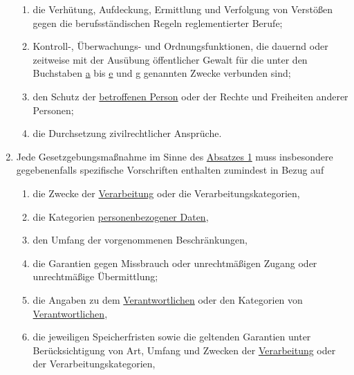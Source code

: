 \begin{enumerate}
\begin{enumerate}
    \item die Verhütung, Aufdeckung, Ermittlung und Verfolgung von Verstößen gegen die berufsständischen Regeln
     reglementierter Berufe;%
    \label{itm:23-1g}

    \item Kontroll-, Überwachungs- und Ordnungsfunktionen, die dauernd oder zeitweise mit der Ausübung öffentlicher
     Gewalt für die unter den Buchstaben \hyperref[itm:23-1a]{a} bis \hyperref[itm:23-1e]{e} und \hyperref[itm:23-1g]
     {g} genannten Zwecke verbunden sind;%
    \label{itm:23-1h}

    \item den Schutz der \hyperref[itm:04-1]{betroffenen Person} oder der Rechte und Freiheiten anderer Personen;%
    \label{itm:23-1i}

    \item die Durchsetzung zivilrechtlicher Ansprüche.%
    \label{itm:23-1j}

  \end{enumerate}

  \item Jede Gesetzgebungsmaßnahme im Sinne des \hyperref[itm:23-1]{Absatzes 1} muss insbesondere gegebenenfalls
   spezifische Vorschriften enthalten zumindest in Bezug auf%
  \label{itm:23-2}

  \begin{enumerate}
  
    \item die Zwecke der \hyperref[itm:04-2]{Verarbeitung} oder die Verarbeitungskategorien,%
    \label{itm:23-2a}

    \item die Kategorien \hyperref[itm:04-1]{personenbezogener Daten},%
    \label{itm:23-2b}

    \item den Umfang der vorgenommenen Beschränkungen,%
    \label{itm:23-2c}

    \item die Garantien gegen Missbrauch oder unrechtmäßigen Zugang oder unrechtmäßige Übermittlung;%
    \label{itm:23-2d}

    \item die Angaben zu dem \hyperref[itm:04-7]{Verantwortlichen} oder den Kategorien von \hyperref[itm:04-7]
     {Verantwortlichen},%
    \label{itm:23-2e}

    \item die jeweiligen Speicherfristen sowie die geltenden Garantien unter Berücksichtigung von Art, Umfang und
     Zwecken der \hyperref[itm:04-2]{Verarbeitung} oder der Verarbeitungskategorien,%
    \label{itm:23-2f}


\end{enumerate}
\end{enumerate}
